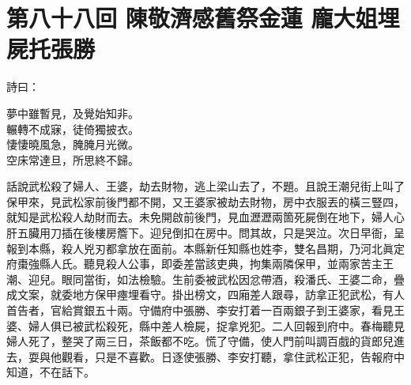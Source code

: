 
\chapter*{第八十八回 陳敬濟感舊祭金蓮 龐大姐埋屍托張勝}


詩曰：

\begin{myquote}
夢中雖暫見，及覺始知非。\\輾轉不成寐，徒倚獨披衣。\\悽悽曉風急，腌腌月光微。\\空床常達旦，所思終不歸。
\end{myquote}

話說武松殺了婦人、王婆，劫去財物，逃上梁山去了，不題。且說王潮兒街上叫了保甲來，見武松家前後門都不開，又王婆家被劫去財物，房中衣服丟的橫三豎四，就知是武松殺人劫財而去。未免開啟前後門，見血瀝瀝兩箇死屍倒在地下，婦人心肝五臟用刀插在後樓房簷下。迎兒倒扣在房中。問其故，只是哭泣。{}次日早衙，呈報到本縣，殺人兇刃都拿放在面前。本縣新任知縣也姓李，雙名昌期，乃河北眞定府棗強縣人氏。聽見殺人公事，即委差當該吏典，拘集兩隣保甲，並兩家苦主王潮、迎兒。眼同當街，如法檢驗。生前委被武松因忿帶酒，殺潘氏、王婆二命，疊成文案，就委地方保甲瘞埋看守。掛出榜文，四廂差人跟尋，訪拿正犯武松，有人首告者，官給賞銀五十兩。守備府中張勝、李安打着一百兩銀子到王婆家，看見王婆、婦人俱已被武松殺死，縣中差人檢屍，捉拿兇犯。二人回報到府中。春梅聽見婦人死了，整哭了兩三日，茶飯都不吃。慌了守備，使人門前叫調百戲的貨郎兒進去，耍與他觀看，只是不喜歡。日逐使張勝、李安打聽，拿住武松正犯，告報府中知道，不在話下。

